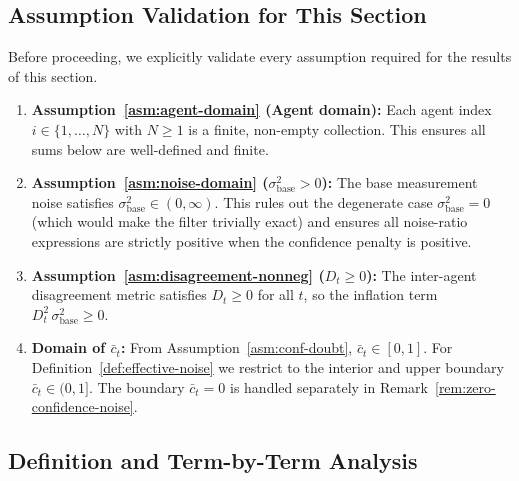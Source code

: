 \documentclass[12pt,openany]{book}
\numberwithin{equation}{chapter}
\theoremstyle{plain}
\theoremstyle{definition}
\theoremstyle{remark}
\begin{document}
\subsection{Assumption Validation for This Section}

Before proceeding, we explicitly validate every assumption
required for the results of this section.

\begin{enumerate}
  \item \textbf{Assumption~\ref{asm:agent-domain} (Agent domain):}
        Each agent index $i \in \{1,\dots,N\}$ with $N \geq 1$ is
        a finite, non-empty collection.  This ensures all sums
        below are well-defined and finite.

  \item \textbf{Assumption~\ref{asm:noise-domain}
        ($\sigma_{\mathrm{base}}^2 > 0$):}
        The base measurement noise satisfies
        $\sigma_{\mathrm{base}}^2 \in (0,\infty)$.  This rules out
        the degenerate case $\sigma_{\mathrm{base}}^2 = 0$
        (which would make the filter trivially exact) and ensures
        all noise-ratio expressions are strictly positive when
        the confidence penalty is positive.

  \item \textbf{Assumption~\ref{asm:disagreement-nonneg}
        ($D_t \geq 0$):}
        The inter-agent disagreement metric satisfies
        $D_t \geq 0$ for all $t$, so the inflation term
        $D_t^2\,\sigma_{\mathrm{base}}^2 \geq 0$.

  \item \textbf{Domain of $\bar{c}_t$:}
        From Assumption~\ref{asm:conf-doubt},
        $\bar{c}_t \in [0,1]$.  For Definition~\ref{def:effective-noise}
        we restrict to the interior and upper boundary
        $\bar{c}_t \in (0,1]$.  The boundary $\bar{c}_t = 0$
        is handled separately in
        Remark~\ref{rem:zero-confidence-noise}.
\end{enumerate}

\subsection{Definition and Term-by-Term Analysis}
\end{document}
